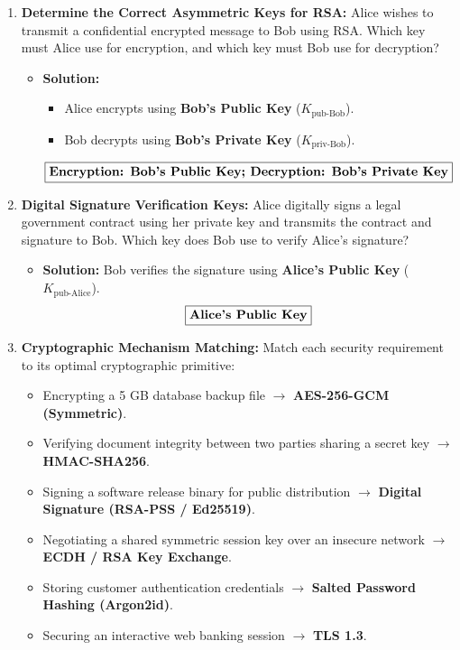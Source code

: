 \begin{enumerate}[label=\textbf{Problem \arabic*.,resume},leftmargin=1.5cm]
\item \textbf{Determine the Correct Asymmetric Keys for RSA:}
Alice wishes to transmit a confidential encrypted message to Bob using RSA. Which key must Alice use for encryption, and which key must Bob use for decryption?
\begin{itemize}
\item \textbf{Solution:}
\begin{itemize}
\item Alice encrypts using \textbf{Bob's Public Key} ($K_{\text{pub-Bob}}$).
\item Bob decrypts using \textbf{Bob's Private Key} ($K_{\text{priv-Bob}}$).
\end{itemize}
\[ \boxed{\text{\textbf{Encryption: Bob's Public Key; Decryption: Bob's Private Key}}} \]
\end{itemize}

\item \textbf{Digital Signature Verification Keys:}
Alice digitally signs a legal government contract using her private key and transmits the contract and signature to Bob. Which key does Bob use to verify Alice's signature?
\begin{itemize}
\item \textbf{Solution:} Bob verifies the signature using \textbf{Alice's Public Key} ($K_{\text{pub-Alice}}$).
\[ \boxed{\text{\textbf{Alice's Public Key}}} \]
\end{itemize}

\item \textbf{Cryptographic Mechanism Matching:}
Match each security requirement to its optimal cryptographic primitive:
\begin{itemize}
\item Encrypting a 5 GB database backup file $\to$ \textbf{AES-256-GCM (Symmetric)}.
\item Verifying document integrity between two parties sharing a secret key $\to$ \textbf{HMAC-SHA256}.
\item Signing a software release binary for public distribution $\to$ \textbf{Digital Signature (RSA-PSS / Ed25519)}.
\item Negotiating a shared symmetric session key over an insecure network $\to$ \textbf{ECDH / RSA Key Exchange}.
\item Storing customer authentication credentials $\to$ \textbf{Salted Password Hashing (Argon2id)}.
\item Securing an interactive web banking session $\to$ \textbf{TLS 1.3}.
\end{itemize}
\end{enumerate}

